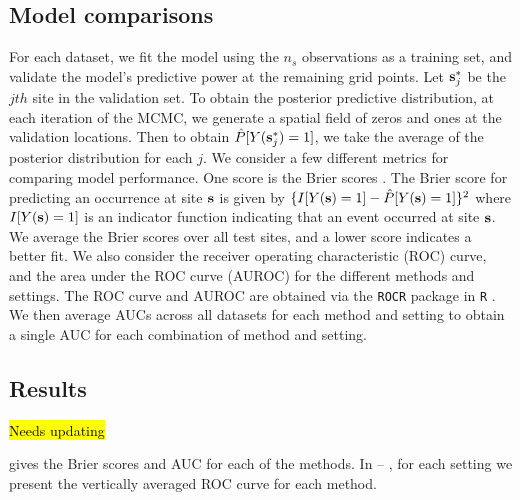 \documentclass[11pt]{article}
\begin{document}
\subsection{Model comparisons}\label{rbs:cv}
For each dataset, we fit the model using the $n_s$ observations as a training set, and validate the model's predictive power at the remaining grid points.
Let $\mbox{\bf s}^*_j$ be the $jth$ site in the validation set.
To obtain the posterior predictive distribution, at each iteration of the MCMC, we generate a spatial field of zeros and ones at the validation locations.
Then to obtain $\hat{P}[Y(\mbox{\bf s}^*_j) = 1]$, we take the average of the posterior distribution for each $j$.
We consider a few different metrics for comparing model performance.
One score is the Brier scores \citep[BS]{Gneiting2007}.
The Brier score for predicting an occurrence at site $\mbox{\bf s}$ is given by $\{I[Y(\mbox{\bf s})=1] - \hat{P}[Y(\mbox{\bf s})=1]\}^2$ where $I[Y(\mbox{\bf s}) = 1]$ is an indicator function indicating that an event occurred at site $\mbox{\bf s}$.
We average the Brier scores over all test sites, and a lower score indicates a better fit.
We also consider the receiver operating characteristic (ROC) curve, and the area under the ROC curve (AUROC) for the different methods and settings.
The ROC curve and AUROC are obtained via the \texttt{ROCR} \citep{Sing2005} package in \texttt{R} \citep{Rmanual}.
We then average AUCs across all datasets for each method and setting to obtain a single AUC for each combination of method and setting.

\subsection{Results} \label{rbs:simresults}
\hl{Needs updating}

 gives the Brier scores and AUC for each of the methods.
In  -- , for each setting we present the vertically averaged ROC curve for each method.
\end{document}
